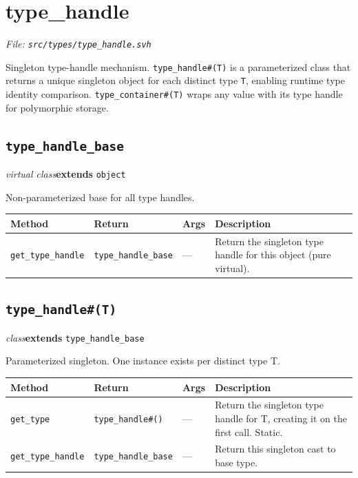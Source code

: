 \documentclass[11pt,letterpaper]{report}
\begin{document}
\section{type\_handle}
\noindent\small\textit{File: \texttt{src/types/type\_handle.svh}}\par

Singleton type-handle mechanism. \texttt{type\_handle\#(T)} is a parameterized class that returns a unique singleton object for each distinct type \texttt{T}, enabling runtime type identity comparison. \texttt{type\_container\#(T)} wraps any value with its type handle for polymorphic storage.

\subsection*{\texttt{type\_handle\_base}}
\noindent\small\textit{virtual class}\quad \textbf{extends} \texttt{object}\par

Non-parameterized base for all type handles.

\begin{xltabular}{\linewidth}{>{\small}p{1.35in} >{\small}p{1.25in} >{\small}p{0.95in} >{\small}X}
\toprule
\textbf{Method} & \textbf{Return} & \textbf{Args} & \textbf{Description} \\
\midrule
\endhead
\bottomrule
\endfoot
\texttt{get\_type\_handle} & \texttt{type\_handle\_base} & --- & Return the singleton type handle for this object (pure virtual). \\
\end{xltabular}

\subsection*{\texttt{type\_handle\#(T)}}
\noindent\small\textit{class}\quad \textbf{extends} \texttt{type\_handle\_base}\par

Parameterized singleton. One instance exists per distinct type T.

\begin{xltabular}{\linewidth}{>{\small}p{1.35in} >{\small}p{1.25in} >{\small}p{0.95in} >{\small}X}
\toprule
\textbf{Method} & \textbf{Return} & \textbf{Args} & \textbf{Description} \\
\midrule
\endhead
\bottomrule
\endfoot
\texttt{get\_type} & \texttt{type\_handle\#()} & --- & Return the singleton type handle for T, creating it on the first call. Static. \\
\texttt{get\_type\_handle} & \texttt{type\_handle\_base} & --- & Return this singleton cast to base type. \\
\end{xltabular}
\end{document}
